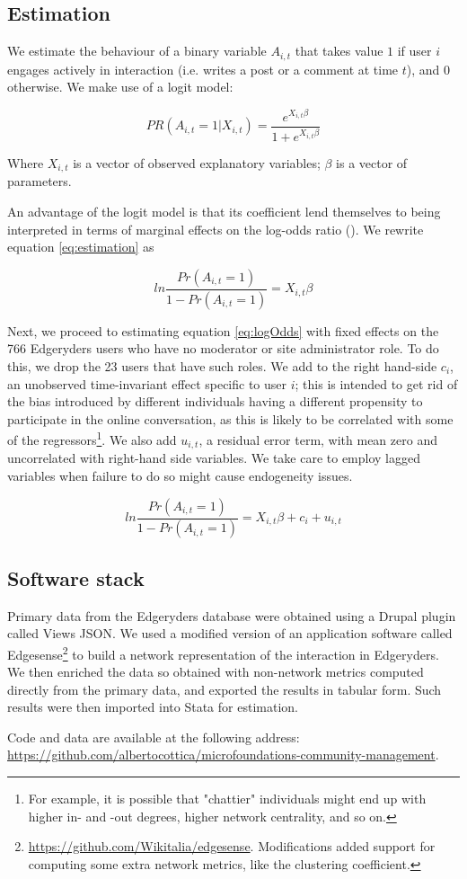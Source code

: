 \subsection{Estimation}

We estimate the behaviour of a binary variable $A_{i,t}$ that takes value $1$ if user $i$ engages actively in interaction (i.e. writes a post or a comment at time $t$), and $0$ otherwise. We make use of a logit model:

\begin{equation}
	PR(A_{i,t}= 1|X_{i,t}) = \frac{e^{X_{i,t}\beta}}{1 + e^{X_{i,t}\beta}}
	\label{eq:estimation}
\end{equation}

Where $X_{i,t}$ is a vector of observed explanatory variables; $\beta$ is a vector of parameters.

An advantage of the logit model is that its coefficient lend themselves to being interpreted in terms of marginal effects on the log-odds ratio (\cite{cameron2005microeconometrics}). We rewrite equation \ref{eq:estimation} as

\begin{equation}
	ln \frac{Pr(A_{i,t} = 1)}{1 - Pr(A_{i,t}=1)} = X_{i,t} \beta 
	\label{eq:logOdds}
\end{equation}

Next, we proceed to estimating equation \ref{eq:logOdds} with fixed effects on the 766 Edgeryders users who have no moderator or site administrator role. To do this, we drop the 23 users that have such roles. We add to the right hand-side
$c_i$, an unobserved time-invariant effect specific to user $i$; this is intended to get rid of the bias introduced by different individuals having a different propensity to participate in the online conversation, as this is likely to be correlated with some of the regressors\footnote{For example, it is possible that "chattier" individuals might end up with higher in- and -out degrees, higher network centrality, and so on. }. We also add $u_{i,t}$, a residual error term, with mean zero and uncorrelated with right-hand side variables. We take care to employ lagged variables when failure to do so might cause endogeneity issues. 

\begin{equation}
	ln \frac{Pr(A_{i,t} = 1)}{1 - Pr(A_{i,t}=1)} = X_{i,t} \beta + c_i + u_{i,t}
	\label{eq:logOddsErrors}
\end{equation}

\subsection{Software stack}
Primary data from the Edgeryders database were obtained using a Drupal plugin called Views JSON. We used a modified version of an application software called Edgesense\footnote{\url{https://github.com/Wikitalia/edgesense}. Modifications added support for computing some extra network metrics, like the clustering coefficient.} to build a network representation of the interaction in Edgeryders. We then enriched the data so obtained with non-network metrics computed directly from the primary data, and exported the results in tabular form. Such results were then imported into Stata for estimation. 

Code and data are available at the following address: \url{https://github.com/albertocottica/microfoundations-community-management}.
